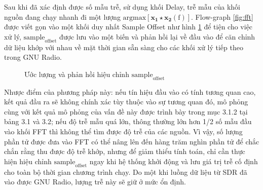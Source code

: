 
Sau khi đã xác định được số mẫu trễ, sử dụng khối Delay, trễ mẫu của khối nguồn đang chạy nhanh đi một lượng $\mathrm{argmax[\mathbf{x_1 \star x_2}(f)]}$.  Flow-graph \ref{fig:fft} được viết gọn vào một khối duy nhất Sample Offset như hình \ref{fig:sample_offset} để tiện cho việc xử lý, $\textrm{sample}_\textrm{offset}$ được lưu vào một biến và phản hồi lại về đầu vào để  căn chỉnh dữ liệu khớp với nhau về mặt thời gian sẵn sàng cho các  khối xử lý tiếp theo trong GNU Radio.

\begin{figure}[!h]
{}
\hfill
{}
\hfill
\caption{Ước lượng và phản hồi hiệu chỉnh $\textrm{sample}_\textrm{offset}$}
\label{fig:sample_offset}
\end{figure}

Nhược điểm của phương pháp này: nếu tín hiệu đầu vào có tính tương quan cao, kết quả đầu ra sẽ không chính xác tùy thuộc vào sự tương quan đó, mô phỏng cùng với kết quả mô phỏng của vấn đề này được trình bày trong mục 3.1.2 tại bảng 3.1 và 3.2; nếu độ trễ mẫu quá lớn, thông thường lớn hơn 1/2 số mẫu đầu vào khối FFT thì không thể tìm được độ trễ của các nguồn. Vì vậy, số lượng phần tử được đưa vào FFT có thể nâng lên đến hàng trăm nghìn phần tử để chắc chắn rằng thu được độ trễ khớp, nhưng để giảm thiểu tính toán, chỉ cần thực hiện hiệu chỉnh $\textrm{sample}_\textrm{offset}$ ngay khi hệ thống khởi động và lưu giá trị trễ cố định cho toàn bộ thời gian chương trình chạy. Do một khi luồng dữ liệu từ SDR đã vào được GNU Radio, lượng trễ này sẽ giữ ở mức ổn định.

